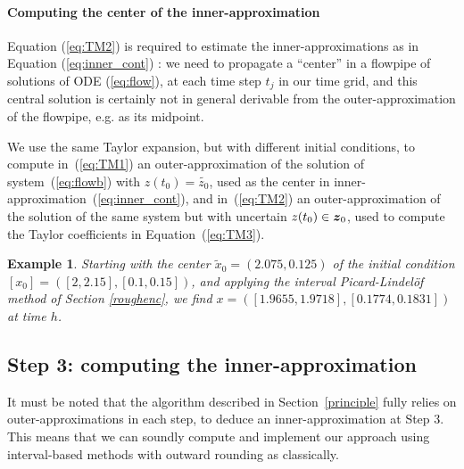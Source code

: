 \documentclass{sig-alternate-05-2015} %
\newcommand\ForAuthors[1]%
 {\par\smallskip                     %
  \begin{center}%
   \fbox%
   {\parbox{0.9\linewidth}%
    {\raggedright\sc--- #1}%
   }%
  \end{center}%
  \par\smallskip                     %
 }
\newtheorem{example}{Example}
\def\intvl#1{\mbox{$[ #1 ]$}}
\newtheorem{remark}{Remark}
\begin{document}
\paragraph{Computing the center of the inner-approximation}

Equation (\ref{eq:TM2}) is required to estimate the inner-approxima\-tions as in Equation (\ref{eq:inner_cont}) : we need to propagate a ``center'' in 
a flowpipe of solutions of ODE (\ref{eq:flow}), at each time step $t_j$ in our time
grid, and this central solution is certainly not in general derivable from the 
outer-approximation of the flowpipe, e.g. as its midpoint. 
 
We use the same Taylor expansion, but with different initial conditions, to compute in~(\ref{eq:TM1}) an outer-approximation of the solution of system~(\ref{eq:flowb}) 
with $z(t_0)=\tilde{z_0}$, used as the center in inner-approximation~(\ref{eq:inner_cont}), and  in~(\ref{eq:TM2}) an outer-approximation of the solution of the 
same system but with uncertain $z(t_0) \in \z_0$, used to compute the Taylor coefficients in Equation~(\ref{eq:TM3}). %

\begin{example}
\label{runningcenter}
Starting with the center $\tilde{x}_0=(2.075,0.125)$ of the initial condition $\intvl{x_0}=\left(
\left[2,2.15\right],\left[0.1,0.15\right]\right)$, and applying the interval Picard-Lindel\"of method
of Section \ref{roughenc}, 
we find $x=\left(\left[1.9655, 1.9718\right], 
\left[0.1774, 0.1831\right]
\right)$ at time $h$.  
\end{example}


\subsection{Step 3: computing the inner-approximation}
\label{practicalissues}

It must be noted that the algorithm described in Section~\ref{principle} fully relies on outer-approximations in each step, 
to deduce an inner-approximation at Step 3. This means that we can soundly compute and implement our approach using interval-based 
methods with outward rounding as classically. 
\end{document}
